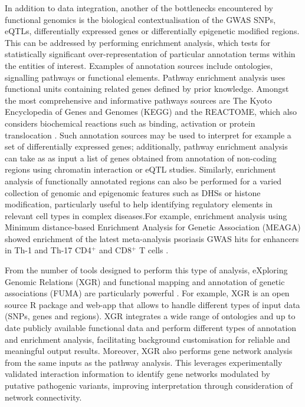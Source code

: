 In addition to data integration, another of the bottlenecks encountered by functional genomics is the biological contextualisation of the GWAS SNPs, eQTLs, differentially expressed genes or differentially epigenetic modified regions. This can be addressed by performing enrichment analysis, which tests for statistically significant over-representation of particular annotation terms within the entities of interest. Examples of annotation sources include ontologies, signalling pathways or functional elements. Pathway enrichment analysis uses functional units containing related genes defined by prior knowledge. Amongst the most comprehensive and informative pathways sources are The Kyoto Encyclopedia of Genes and Genomes (KEGG) and the REACTOME, which also considers biochemical reactions such as binding, activation or protein translocation \parencite{Kanehisa2000}. Such annotation sources may be used to interpret for example a set of differentially expressed genes; additionally, pathway enrichment analysis can take as as input a list of genes obtained from annotation of non-coding regions using chromatin interaction or eQTL studies. Similarly, enrichment analysis of functionally annotated regions can also be performed for a varied collection of genomic and epigenomic features such as DHSs or histone modification, particularly useful to help identifying regulatory elements in relevant cell types in complex diseases.For example, enrichment analysis using Minimum distance-based Enrichment Analysis for Genetic Association (MEAGA) showed enrichment of the latest meta-analysis psoriasis GWAS hits for enhancers in Th-1 and Th-17 CD4$^+$ and CD8$^+$ T cells \parencite{Tsoi2017}.

From the number of tools designed to perform this type of analysis, eXploring Genomic Relations (XGR) and functional mapping and annotation of genetic associations (FUMA) are particularly powerful \parencite{Fang2016,Watanabe2017}. For example, XGR is an open source R package and web-app that allows to handle different types of input data (SNPs, genes and regions). XGR integrates a wide range of ontologies and up to date publicly available functional data and perform different types of annotation and enrichment analysis, facilitating background customisation for reliable and meaningful output results. Moreover, XGR also performs gene network analysis from the same inputs as the pathway analysis. This leverages experimentally validated interaction information to identify gene networks modulated by putative pathogenic variants, improving interpretation through consideration of network connectivity.

